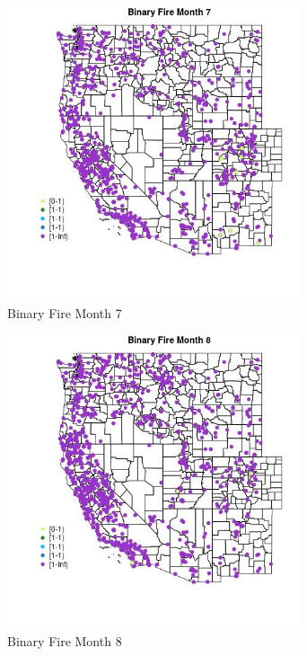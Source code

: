 \begin{figure} 
\centering  
\includegraphics[width=0.77\textwidth]{Code_Outputs/Report_ML_input_PM25_Step4_part_f_de_duplicated_aves_prioritize_24hr_obswNAs_MapObsMo7Binary_Fire.jpg} 
\caption{\label{fig:Report_ML_input_PM25_Step4_part_f_de_duplicated_aves_prioritize_24hr_obswNAsMapObsMo7Binary_Fire}Binary Fire Month 7} 
\end{figure} 
 

\begin{figure} 
\centering  
\includegraphics[width=0.77\textwidth]{Code_Outputs/Report_ML_input_PM25_Step4_part_f_de_duplicated_aves_prioritize_24hr_obswNAs_MapObsMo8Binary_Fire.jpg} 
\caption{\label{fig:Report_ML_input_PM25_Step4_part_f_de_duplicated_aves_prioritize_24hr_obswNAsMapObsMo8Binary_Fire}Binary Fire Month 8} 
\end{figure} 
 

